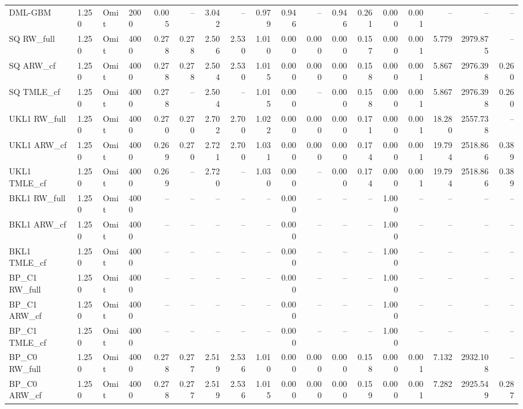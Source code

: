 \begin{tabular}{llllrrrrrrrrrrrrrr}
DML-GBM & 1.250 & Omit & 2000 & 0.005 & -- & 3.042 & -- & 0.979 & 0.946 & -- & 0.946 & 0.261 & 0.000 & 0.001 & -- & -- & -- \\
SQ RW\_full & 1.250 & Omit & 4000 & 0.278 & 0.278 & 2.506 & 2.530 & 1.010 & 0.000 & 0.000 & 0.000 & 0.157 & 0.000 & 0.001 & 5.779 & 2979.875 & -- \\
SQ ARW\_cf & 1.250 & Omit & 4000 & 0.278 & 0.278 & 2.504 & 2.530 & 1.015 & 0.000 & 0.000 & 0.000 & 0.158 & 0.000 & 0.001 & 5.867 & 2976.398 & 0.260 \\
SQ TMLE\_cf & 1.250 & Omit & 4000 & 0.278 & -- & 2.504 & -- & 1.015 & 0.000 & -- & 0.000 & 0.158 & 0.000 & 0.001 & 5.867 & 2976.398 & 0.260 \\
UKL1 RW\_full & 1.250 & Omit & 4000 & 0.270 & 0.270 & 2.702 & 2.700 & 1.022 & 0.000 & 0.000 & 0.000 & 0.171 & 0.000 & 0.001 & 18.280 & 2557.738 & -- \\
UKL1 ARW\_cf & 1.250 & Omit & 4000 & 0.269 & 0.270 & 2.721 & 2.700 & 1.031 & 0.000 & 0.000 & 0.000 & 0.174 & 0.000 & 0.001 & 19.794 & 2518.866 & 0.389 \\
UKL1 TMLE\_cf & 1.250 & Omit & 4000 & 0.269 & -- & 2.720 & -- & 1.030 & 0.000 & -- & 0.000 & 0.174 & 0.000 & 0.001 & 19.794 & 2518.866 & 0.389 \\
BKL1 RW\_full & 1.250 & Omit & 4000 & -- & -- & -- & -- & -- & 0.000 & -- & -- & -- & 1.000 & -- & -- & -- & -- \\
BKL1 ARW\_cf & 1.250 & Omit & 4000 & -- & -- & -- & -- & -- & 0.000 & -- & -- & -- & 1.000 & -- & -- & -- & -- \\
BKL1 TMLE\_cf & 1.250 & Omit & 4000 & -- & -- & -- & -- & -- & 0.000 & -- & -- & -- & 1.000 & -- & -- & -- & -- \\
BP\_C1 RW\_full & 1.250 & Omit & 4000 & -- & -- & -- & -- & -- & 0.000 & -- & -- & -- & 1.000 & -- & -- & -- & -- \\
BP\_C1 ARW\_cf & 1.250 & Omit & 4000 & -- & -- & -- & -- & -- & 0.000 & -- & -- & -- & 1.000 & -- & -- & -- & -- \\
BP\_C1 TMLE\_cf & 1.250 & Omit & 4000 & -- & -- & -- & -- & -- & 0.000 & -- & -- & -- & 1.000 & -- & -- & -- & -- \\
BP\_C0 RW\_full & 1.250 & Omit & 4000 & 0.278 & 0.277 & 2.519 & 2.536 & 1.010 & 0.000 & 0.000 & 0.000 & 0.158 & 0.000 & 0.001 & 7.132 & 2932.108 & -- \\
BP\_C0 ARW\_cf & 1.250 & Omit & 4000 & 0.278 & 0.277 & 2.519 & 2.536 & 1.015 & 0.000 & 0.000 & 0.000 & 0.159 & 0.000 & 0.001 & 7.282 & 2925.549 & 0.287 \\

\end{tabular}

